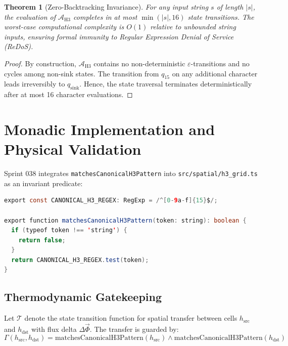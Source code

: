 \documentclass[11pt,a4paper]{article}
\newtheorem{theorem}{Theorem}
\begin{document}
\begin{theorem}[Zero-Backtracking Invariance]
For any input string $s$ of length $|s|$, the evaluation of $\mathcal{A}_{\text{H3}}$ completes in at most $\min(|s|, 16)$ state transitions. The worst-case computational complexity is $O(1)$ relative to unbounded string inputs, ensuring formal immunity to Regular Expression Denial of Service (ReDoS).
\end{theorem}

\begin{proof}
By construction, $\mathcal{A}_{\text{H3}}$ contains no non-deterministic $\varepsilon$-transitions and no cycles among non-sink states. The transition from $q_{15}$ on any additional character leads irreversibly to $q_{\text{sink}}$. Hence, the state traversal terminates deterministically after at most 16 character evaluations.
\end{proof}

\section{Monadic Implementation and Physical Validation}

Sprint 038 integrates \texttt{matchesCanonicalH3Pattern} into \texttt{src/spatial/h3\_grid.ts} as an invariant predicate:

\begin{lstlisting}[language=Java, caption={Stateless Canonical Pattern Predicate in TypeScript}]
export const CANONICAL_H3_REGEX: RegExp = /^[0-9a-f]{15}$/;

export function matchesCanonicalH3Pattern(token: string): boolean {
  if (typeof token !== 'string') {
    return false;
  }
  return CANONICAL_H3_REGEX.test(token);
}
\end{lstlisting}

\subsection{Thermodynamic Gatekeeping}

Let $\mathcal{T}$ denote the state transition function for spatial transfer between cells $h_{\text{src}}$ and $h_{\text{dst}}$ with flux delta $\Delta \vec{\Phi}$. The transfer is guarded by:
\begin{equation}
    \Gamma(h_{\text{src}}, h_{\text{dst}}) = \text{matchesCanonicalH3Pattern}(h_{\text{src}}) \land \text{matchesCanonicalH3Pattern}(h_{\text{dst}})
\end{equation}
\end{document}
